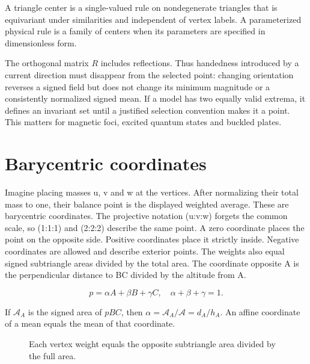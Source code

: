 \documentclass[11pt,oneside,openany]{book}
\begin{document}
\begin{definition}
A triangle center is a single-valued rule on nondegenerate triangles
that is equivariant under similarities and independent of vertex labels.
A parameterized physical rule is a family of centers when its parameters
are specified in dimensionless form.
\end{definition}
The orthogonal matrix $R$ includes reflections. Thus handedness introduced
by a current direction must disappear from the selected point: changing
orientation reverses a signed field but does not change its minimum
magnitude or a consistently normalized signed mean. If a model has two
equally valid extrema, it defines an invariant set until a justified
selection convention makes it a point. This matters for magnetic foci,
excited quantum states and buckled plates.




\section{Barycentric coordinates}\label{sec:slide4}

Imagine placing masses u, v and w at the vertices. After normalizing their total mass to one, their balance point is the displayed weighted average. These are barycentric coordinates. The projective notation (u:v:w) forgets the common scale, so (1:1:1) and (2:2:2) describe the same point. A zero coordinate places the point on the opposite side. Positive coordinates place it strictly inside. Negative coordinates are allowed and describe exterior points. The weights also equal signed subtriangle areas divided by the total area. The coordinate opposite A is the perpendicular distance to BC divided by the altitude from A.


\[p=\alpha A+\beta B+\gamma C,\quad\alpha+\beta+\gamma=1.\]


If $\mathcal A_A$ is the signed area of $pBC$, then
$\alpha=\mathcal A_A/\mathcal A=d_A/h_A$. An affine coordinate of a
mean equals the mean of that coordinate.


\begin{figure}[htbp]\centering
{}
\caption[Each vertex weight equals the opposite subtriangle area divided by the full area]{Each vertex weight equals the opposite subtriangle area divided by the full area.}\label{fig:geometry-4}
\end{figure}
\end{document}
